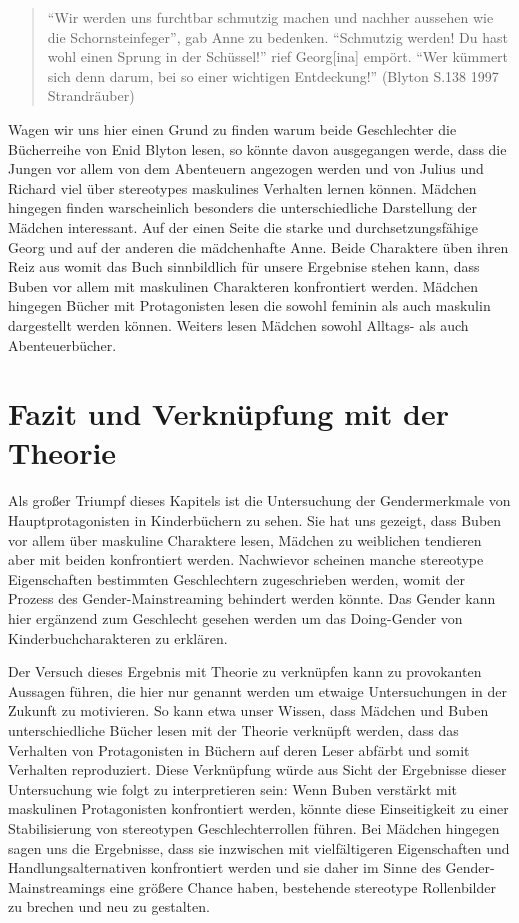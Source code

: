 \begin{quote}
``Wir werden uns furchtbar schmutzig machen und nachher aussehen wie die
Schornsteinfeger'', gab Anne zu bedenken. ``Schmutzig werden! Du hast
wohl einen Sprung in der Schüssel!'' rief Georg{[}ina{]} empört. ``Wer
kümmert sich denn darum, bei so einer wichtigen Entdeckung!'' (Blyton
S.138 1997 Strandräuber)
\end{quote}

Wagen wir uns hier einen Grund zu finden warum beide Geschlechter die
Bücherreihe von Enid Blyton lesen, so könnte davon ausgegangen werde,
dass die Jungen vor allem von dem Abenteuern angezogen werden und von
Julius und Richard viel über stereotypes maskulines Verhalten lernen
können. Mädchen hingegen finden warscheinlich besonders die
unterschiedliche Darstellung der Mädchen interessant. Auf der einen
Seite die starke und durchsetzungsfähige Georg und auf der anderen die
mädchenhafte Anne. Beide Charaktere üben ihren Reiz aus womit das Buch
sinnbildlich für unsere Ergebnise stehen kann, dass Buben vor allem mit
maskulinen Charakteren konfrontiert werden. Mädchen hingegen Bücher mit
Protagonisten lesen die sowohl feminin als auch maskulin dargestellt
werden können. Weiters lesen Mädchen sowohl Alltags- als auch
Abenteuerbücher.

\section{Fazit und Verknüpfung mit der Theorie}

Als großer Triumpf dieses Kapitels ist die Untersuchung der
Gendermerkmale von Hauptprotagonisten in Kinderbüchern zu sehen. Sie hat
uns gezeigt, dass Buben vor allem über maskuline Charaktere lesen,
Mädchen zu weiblichen tendieren aber mit beiden konfrontiert werden.
Nachwievor scheinen manche stereotype Eigenschaften bestimmten
Geschlechtern zugeschrieben werden, womit der Prozess des
Gender-Mainstreaming behindert werden könnte. Das Gender kann hier
ergänzend zum Geschlecht gesehen werden um das Doing-Gender von
Kinderbuchcharakteren zu erklären.

Der Versuch dieses Ergebnis mit Theorie zu verknüpfen kann zu
provokanten Aussagen führen, die hier nur genannt werden um etwaige
Untersuchungen in der Zukunft zu motivieren. So kann etwa unser Wissen,
dass Mädchen und Buben unterschiedliche Bücher lesen mit der Theorie
verknüpft werden, dass das Verhalten von Protagonisten in Büchern auf
deren Leser abfärbt und somit Verhalten reproduziert. Diese Verknüpfung
würde aus Sicht der Ergebnisse dieser Untersuchung wie folgt zu
interpretieren sein: Wenn Buben verstärkt mit maskulinen Protagonisten
konfrontiert werden, könnte diese Einseitigkeit zu einer Stabilisierung
von stereotypen Geschlechterrollen führen. Bei Mädchen hingegen sagen
uns die Ergebnisse, dass sie inzwischen mit vielfältigeren Eigenschaften
und Handlungsalternativen konfrontiert werden und sie daher im Sinne des
Gender-Mainstreamings eine größere Chance haben, bestehende stereotype
Rollenbilder zu brechen und neu zu gestalten.

